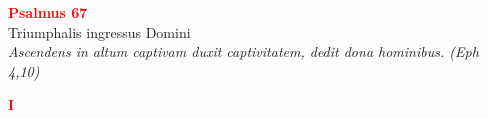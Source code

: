 


\def\greinitialformat#1{%
{\fontsize{39}{39}\selectfont #1}%
}




\vspace{0.3cm}
\begin{center}
 \textcolor{red}{\large \bf Psalmus 67}\\
Triumphalis ingressus Domini\\
\textit{\small Ascendens in altum captivam duxit captivitatem, dedit dona hominibus. (Eph 4,10)}
\end{center}
\begin{center}
\textcolor{red}{\bf I}
\end{center}

